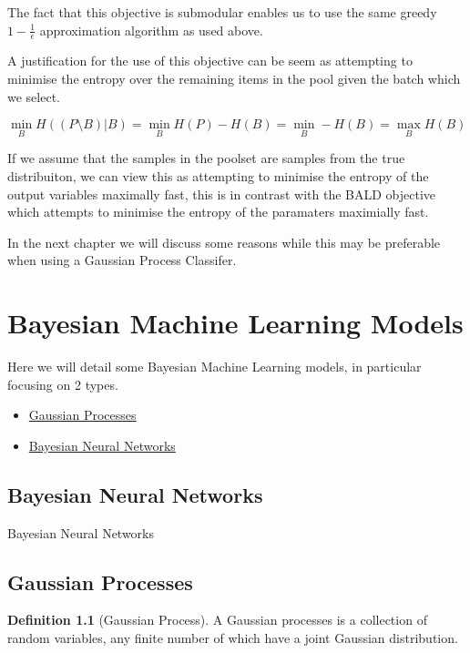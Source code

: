 \documentclass[12pt, a4paper]{report}
\theoremstyle{definition}
\newtheorem{definition}{Definition}[section]
\begin{document}
The fact that this objective is submodular enables us to use the same greedy $1 - \frac{1}{\epsilon}$ approximation algorithm as used above.

A justification for the use of this objective can be seem as attempting to minimise the entropy over the remaining items in the pool given the batch which we select.


$$\min_{B} H( \left(P \setminus B\right) | B) = \min_{B} H(P) - H(B) = \min_{B} - H(B) = \max_B H(B)$$

If we assume that the samples in the poolset are samples from the true distribuiton, we can view this as attempting to minimise the entropy of the output variables maximally fast, this is in contrast with the BALD objective which attempts to minimise the entropy of the paramaters maximially fast.

In the next chapter we will discuss some reasons while this may be preferable when using a Gaussian Process Classifer.

\chapter{Bayesian Machine Learning Models}

Here we will detail some Bayesian Machine Learning models, in particular focusing on 2 types.

\begin{itemize}
    \item \hyperref[sec:GaussianProcesses]{Gaussian Processes}
    \item \hyperref[sec:BNNs]{Bayesian Neural Networks}
\end{itemize}

\section{Bayesian Neural Networks}
\label{sec:BNNs}


Bayesian Neural Networks

\section{Gaussian Processes}
\label{sec:GaussianProcesses}


\begin{definition}[Gaussian Process]
    A Gaussian processes is a collection of random variables, any finite number of which have a joint Gaussian distribution. \cite[]{rasmussen2003gaussian}
\end{definition}
\end{document}
